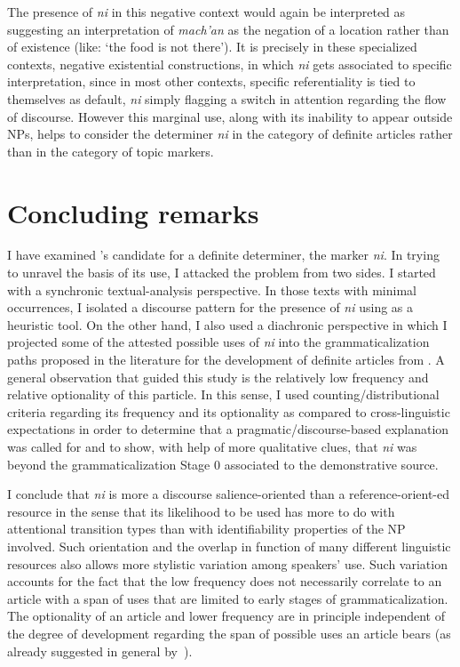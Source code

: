 \documentclass[output=paper
,modfonts
,nonflat]{langsci/langscibook}
\begin{document}
The presence of \textit{ni} in this negative context would again be interpreted as suggesting an interpretation of \textit{mach'an} as the negation of a location rather than of existence (like: `the food is not there'). It is precisely in these specialized contexts, negative existential constructions, in which \textit{ni} gets associated to specific  interpretation, since in most other contexts, specific referentiality is tied to  themselves as default, \textit{ni} simply flagging a switch in attention regarding the flow of discourse. However this marginal use, along with its inability to appear outside NPs, helps to consider the determiner \textit{ni} in the category of definite articles rather than in the category of topic markers.

\section{Concluding remarks}\label{sec:pico:5}\largerpage

I have examined 's candidate for a definite determiner, the marker \textit{ni}.  
In trying to unravel the basis of its use, I attacked the problem from two sides. I started with a synchronic textual-analysis perspective. In those texts with minimal occurrences, I isolated a discourse pattern for the presence of \textit{ni} using  as a heuristic tool. On the other hand, I also used a diachronic perspective in which I projected some of the attested possible uses of \textit{ni} into the grammaticalization paths proposed in the literature for the development of definite articles from . 
A general observation that guided this study is the relatively low frequency and relative optionality of this particle. In this sense, I used counting/distributional criteria regarding its frequency and its optionality as compared to cross-linguistic expectations in order to determine that a pragmatic/discourse-based explanation was called for and to show, with help of more qualitative clues, that \textit{ni} was beyond the grammaticalization Stage 0 associated to the demonstrative source.

I conclude that \textit{ni} is more a discourse salience-oriented than a reference-orient\hyp{}ed resource in the sense that its likelihood to be used has more to do with attentional transition types than with identifiability properties of the NP involved. Such orientation and the overlap in function of many different linguistic resources also allows more stylistic variation among speakers' use. Such variation accounts for the fact that the low frequency does not necessarily correlate to an article with a span of uses that are limited to early stages of grammaticalization.
The optionality of an article and lower frequency are in principle independent of  the degree of development regarding the span of possible uses an article bears (as already suggested in general by~\citealt{Dryer2014}).\largerpage
\end{document}
